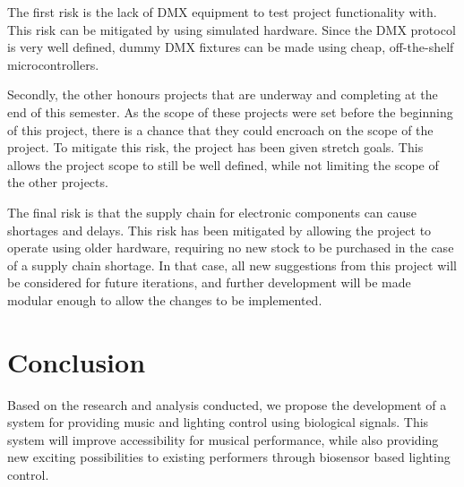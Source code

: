 The first risk is the lack of DMX equipment to test project functionality with.
This risk can be mitigated by using simulated hardware.
Since the DMX protocol is very well defined,
dummy DMX fixtures can be made using cheap, off-the-shelf microcontrollers.

Secondly, the other honours projects that are underway and completing at the end of this semester.
As the scope of these projects were set before the beginning of this project,
there is a chance that they could encroach on the scope of the project.
To mitigate this risk, the project has been given stretch goals.
This allows the project scope to still be well defined,
while not limiting the scope of the other projects.

The final risk is that the supply chain for electronic components can cause shortages and delays.
This risk has been mitigated by allowing the project to operate using older hardware,
requiring no new stock to be purchased in the case of a supply chain shortage.
In that case, all new suggestions from this project will be considered for future iterations,
and further development will be made modular enough to allow the changes to be implemented.

\section{Conclusion}
Based on the research and analysis conducted,
we propose the development of a system for providing music and lighting control using biological signals.
This system will improve accessibility for musical performance,
while also providing new exciting possibilities to existing performers through biosensor based lighting control.
